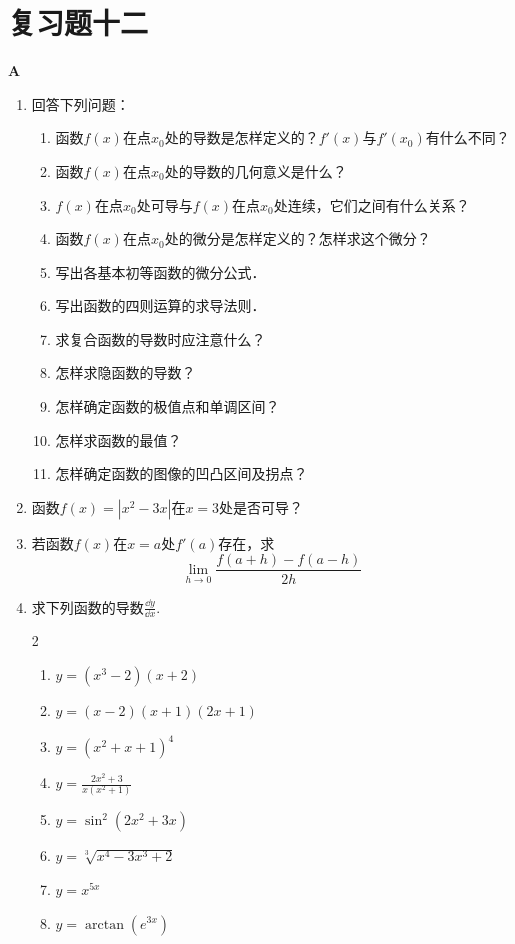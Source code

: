 \section*{复习题十二}
\begin{center}
    \bfseries A
\end{center}
\begin{enumerate}
    \item 回答下列问题：
\begin{enumerate}[(1)]
\item 函数$f(x)$在点$x_0$处的导数是怎样定义的？$f'(x)$与$f'(x_0)$有什么不同？
\item 函数$f(x)$在点$x_0$处的导数的几何意义是什么？
\item $f(x)$在点$x_0$处可导与$f(x)$在点$x_0$处连续，它们之间有什么关系？
\item 函数$f(x)$在点$x_0$处的微分是怎样定义的？怎样求这个微分？
\item 写出各基本初等函数的微分公式．
\item 写出函数的四则运算的求导法则．
\item 求复合函数的导数时应注意什么？
\item 怎样求隐函数的导数？
\item 怎样确定函数的极值点和单调区间？
\item 怎样求函数的最值？
\item 怎样确定函数的图像的凹凸区间及拐点？
\end{enumerate}

    \item 函数$f(x)=|x^2-3x|$在$x=3$处是否可导？
    \item 若函数$f(x)$在$x=a$处$f'(a)$存在，求\[\lim_{h\to 0}\frac{f(a+h)-f(a-h)}{2h}\]
    \item 求下列函数的导数$\frac{\dd y}{\dd x}$.
\begin{multicols}{2}
 \begin{enumerate}[(1)]
    \item $y=(x^3-2)(x+2)$
    \item $y=(x-2)(x+1)(2x+1)$
    \item $y=(x^2+x+1)^4$
    \item $y=\frac{2x^2+3}{x(x^2+1)}$
    \item $y=\sin^2(2x^2+3x)$
    \item $y=\sqrt[3]{x^4-3x^3+2}$
    \item $y=x^{5x}$
    \item $y=\arctan(e^{3x})$
\end{enumerate}   
\end{multicols}


\end{enumerate}
